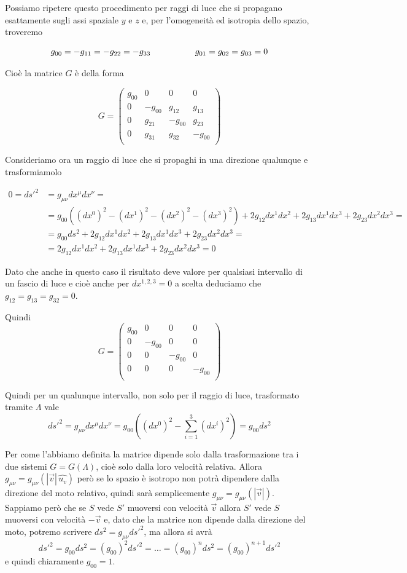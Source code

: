 \documentclass[12pt,a4paper,titlepage, twoside, openright]{book}
\numberwithin{equation}{chapter}
\begin{document}
Possiamo ripetere questo procedimento per raggi di luce che si propagano esattamente sugli assi spaziale $y$ e $z$ e, per l'omogeneità ed isotropia dello spazio, troveremo 

\[ g_{00}=-g_{11}=-g_{22}=-g_{33} \hspace{0.15\linewidth} g_{01}=g_{02}=g_{03}=0 \]

Cioè la matrice $G$ è della forma

\[
G=\left(\begin{array}{cccc}
g_{00} & 0 & 0 & 0 \\
0 & -g_{00} & g_{12} & g_{13} \\
0 & g_{21} & -g_{00} & g_{23} \\
0 & g_{31} & g_{32} & -g_{00} \\
\end{array}
\right)
\]

Consideriamo ora un raggio di luce che si propaghi in una direzione qualunque e trasformiamolo

\begin{align*}
0= ds'^2 &=  g_{\mu\nu}dx^\mu dx^\nu =\\ &= g_{00}\left((dx^0)^2-(dx^1)^2-(dx^2)^2-(dx^3)^2 \right) + 2g_{12} dx^1dx^2 + 2g_{13} dx^1dx^3  + 2g_{23} dx^2dx^3 = \\
&=g_{00}ds^2 + 2g_{12} dx^1dx^2 + 2g_{13} dx^1dx^3  + 2g_{23} dx^2dx^3 = \\
&= 2g_{12} dx^1dx^2 + 2g_{13} dx^1dx^3  + 2g_{23} dx^2dx^3 =0
\end{align*}

Dato che anche in questo caso il risultato deve valore per qualsiasi intervallo di un fascio di luce e cioè anche per $dx^{1,2,3}=0$ a scelta deduciamo che $g_{12}=g_{13}=g_{32}=0$.

Quindi 
\[
G=\left(\begin{array}{cccc}
g_{00} & 0 & 0 & 0 \\
0 & -g_{00} & 0 & 0 \\
0 & 0 & -g_{00} & 0 \\
0 & 0 & 0 & -g_{00} \\
\end{array}
\right)
\]

Quindi per un qualunque intervallo, non solo per il raggio di luce, trasformato tramite $\Lambda$ vale 
\[
ds'^2=g_{\mu\nu}dx^\mu dx^\nu=g_{00}\left( (dx^0)^2 - \sum_{i=1}^{3} (dx^i)^2 \right) = g_{00} ds^2
\]

Per come l'abbiamo definita la matrice dipende solo dalla trasformazione tra i due sistemi $G=G(\Lambda)$, cioè solo dalla loro velocità relativa\footnotemark{}. Allora  $g_{\mu\nu}=g_{\mu\nu}(| \vec{v} | \, \hat{u_v})$ però se lo spazio è isotropo non potrà dipendere dalla direzione del moto relativo, quindi sarà semplicemente $g_{\mu\nu}=g_{\mu\nu}(| \vec{v} | )$. \\
Sappiamo però che se $S$ vede $S'$ muoversi con velocità $\vec{v}$ allora $S'$ vede $S$ muoversi con velocità $-\vec{v}$ e, dato che la matrice non dipende dalla direzione del moto, potremo scrivere $ds^2=g_{\mu\nu} ds'^2$, ma allora si avrà
\[
ds'^2=g_{00}ds^2=(g_{00})^2ds'^2=\dots=(g_{00})^nds^2=(g_{00})^{n+1}ds'^2
\]
e quindi chiaramente $g_{00}=1$. 
\end{document}
